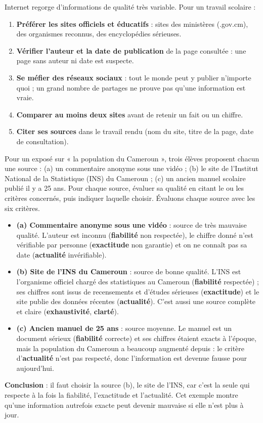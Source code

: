 \documentclass[11pt]{article}
\begin{document}
\begin{methode}
Internet regorge d'informations de qualité très variable. Pour un travail scolaire :
\begin{enumerate}
\item \textbf{Préférer les sites officiels et éducatifs} : sites des ministères (.gov.cm), des organismes reconnus, des encyclopédies sérieuses.
\item \textbf{Vérifier l'auteur et la date de publication} de la page consultée : une page sans auteur ni date est suspecte.
\item \textbf{Se méfier des réseaux sociaux} : tout le monde peut y publier n'importe quoi ; un grand nombre de partages ne prouve pas qu'une information est vraie.
\item \textbf{Comparer au moins deux sites} avant de retenir un fait ou un chiffre.
\item \textbf{Citer ses sources} dans le travail rendu (nom du site, titre de la page, date de consultation).
\end{enumerate}
\end{methode}

\begin{exoresolu}
Pour un exposé sur « la population du Cameroun », trois élèves proposent chacun une source : (a) un commentaire anonyme sous une vidéo ; (b) le site de l'Institut National de la Statistique (INS) du Cameroun ; (c) un ancien manuel scolaire publié il y a 25 ans. Pour chaque source, évaluer sa qualité en citant le ou les critères concernés, puis indiquer laquelle choisir.
\tcblower
Évaluons chaque source avec les six critères.
\begin{itemize}
\item \textbf{(a) Commentaire anonyme sous une vidéo} : source de très mauvaise qualité. L'auteur est inconnu (\textbf{fiabilité} non respectée), le chiffre donné n'est vérifiable par personne (\textbf{exactitude} non garantie) et on ne connaît pas sa date (\textbf{actualité} invérifiable).
\item \textbf{(b) Site de l'INS du Cameroun} : source de bonne qualité. L'INS est l'organisme officiel chargé des statistiques au Cameroun (\textbf{fiabilité} respectée) ; ses chiffres sont issus de recensements et d'études sérieuses (\textbf{exactitude}) et le site publie des données récentes (\textbf{actualité}). C'est aussi une source complète et claire (\textbf{exhaustivité}, \textbf{clarté}).
\item \textbf{(c) Ancien manuel de 25 ans} : source moyenne. Le manuel est un document sérieux (\textbf{fiabilité} correcte) et ses chiffres étaient exacts à l'époque, mais la population du Cameroun a beaucoup augmenté depuis : le critère d'\textbf{actualité} n'est pas respecté, donc l'information est devenue fausse pour aujourd'hui.
\end{itemize}
\textbf{Conclusion} : il faut choisir la source (b), le site de l'INS, car c'est la seule qui respecte à la fois la fiabilité, l'exactitude et l'actualité. Cet exemple montre qu'une information autrefois exacte peut devenir mauvaise si elle n'est plus à jour.
\end{exoresolu}
\end{document}
